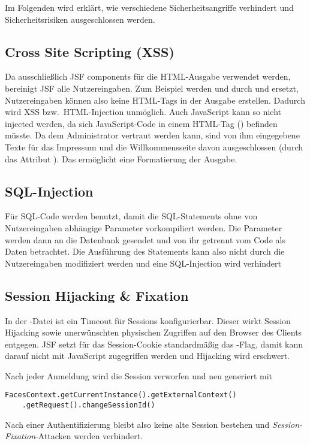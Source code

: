 
Im Folgenden wird erklärt, wie verschiedene Sicherheitsangriffe verhindert und Sicherheitsrisiken ausgeschlossen werden.

\subsection{Cross Site Scripting (XSS)}\label{subsec:xss}
Da ausschließlich JSF components für die HTML-Ausgabe verwendet werden, bereinigt JSF alle Nutzereingaben.
Zum Beispiel werden  und  durch  und  ersetzt, Nutzereingaben können also keine HTML-Tags in der Ausgabe erstellen.
Dadurch wird XSS bzw.\ HTML-Injection unmöglich.
Auch JavaScript kann so nicht injected werden, da sich JavaScript-Code in einem HTML-Tag () befinden müsste.
Da dem Administrator vertraut werden kann, sind von ihm eingegebene Texte für das Impressum und die Willkommensseite davon ausgeschlossen (durch das Attribut ). Das ermöglicht eine Formatierung der Ausgabe.

\subsection{SQL-Injection}\label{subsec:sql-injection}
Für SQL-Code werden  benutzt, damit die SQL-Statements ohne von Nutzereingaben abhängige Parameter vorkompiliert werden.
Die Parameter werden dann an die Datenbank gesendet und von ihr getrennt vom Code als Daten betrachtet.
Die Ausführung des Statements kann also nicht durch die Nutzereingaben modifiziert werden und eine SQL-Injection wird verhindert

\subsection{Session Hijacking \& Fixation}\label{subsec:session-hijacking}
In der -Datei ist ein Timeout für Sessions konfigurierbar.
Dieser wirkt Session Hijacking sowie unerwünschten physischen Zugriffen auf den Browser des Clients entgegen.
JSF setzt für das Session-Cookie standardmäßig das -Flag, damit kann darauf nicht mit JavaScript zugegriffen werden und Hijacking wird erschwert.

Nach jeder Anmeldung wird die Session verworfen und neu generiert mit
{\small
\begin{lstlisting}
FacesContext.getCurrentInstance().getExternalContext()
    .getRequest().changeSessionId()
\end{lstlisting}
}
Nach einer Authentifizierung bleibt also keine alte Session bestehen und \emph{Session-Fixation}-Attacken werden verhindert.

